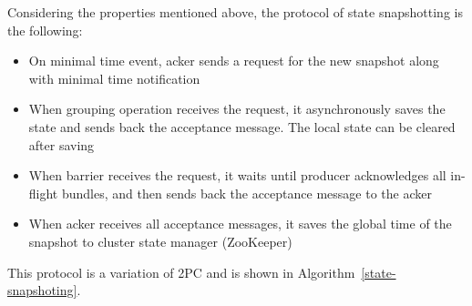 Considering the properties mentioned above, the protocol of state snapshotting is the following:

\begin{itemize}
    \item On minimal time event, acker sends a request for the new snapshot along with minimal time notification
    \item When grouping operation receives the request, it asynchronously saves the state and sends back the acceptance message. The local state can be cleared after saving
    \item When barrier receives the request, it waits until producer acknowledges all in-flight bundles, and then sends back the acceptance message to the acker
    \item When acker receives all acceptance messages, it saves the global time of the snapshot to cluster state manager (ZooKeeper) 
\end{itemize}

This protocol is a variation of 2PC and is shown in Algorithm~\ref{state-snapshoting}.

